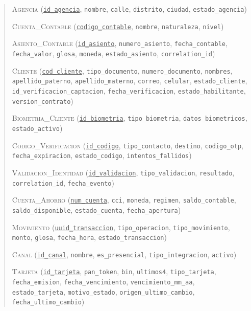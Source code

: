 \begin{quote}\raggedright
\textsc{Agencia} (\underline{\texttt{id\_agencia}}, \texttt{nombre}, \texttt{calle}, \texttt{distrito}, \texttt{ciudad}, \texttt{estado\_agencia})

\textsc{Cuenta\_Contable} (\underline{\texttt{codigo\_contable}}, \texttt{nombre}, \texttt{naturaleza}, \texttt{nivel})

\textsc{Asiento\_Contable} (\underline{\texttt{id\_asiento}}, \texttt{numero\_asiento}, \texttt{fecha\_contable}, \texttt{fecha\_valor}, \texttt{glosa}, \texttt{moneda}, \texttt{estado\_asiento}, \texttt{correlation\_id})

\textsc{Cliente} (\underline{\texttt{cod\_cliente}}, \texttt{tipo\_documento}, \texttt{numero\_documento}, \texttt{nombres}, \texttt{apellido\_paterno}, \texttt{apellido\_materno}, \texttt{correo}, \texttt{celular}, \texttt{estado\_cliente}, \texttt{id\_verificacion\_captacion}, \texttt{fecha\_verificacion}, \texttt{estado\_habilitante}, \texttt{version\_contrato})

\textsc{Biometria\_Cliente} (\underline{\texttt{id\_biometria}}, \texttt{tipo\_biometria}, \texttt{datos\_biometricos}, \texttt{estado\_activo})

\textsc{Codigo\_Verificacion} (\underline{\texttt{id\_codigo}}, \texttt{tipo\_contacto}, \texttt{destino}, \texttt{codigo\_otp}, \texttt{fecha\_expiracion}, \texttt{estado\_codigo}, \texttt{intentos\_fallidos})

\textsc{Validacion\_Identidad} (\underline{\texttt{id\_validacion}}, \texttt{tipo\_validacion}, \texttt{resultado}, \texttt{correlation\_id}, \texttt{fecha\_evento})

\textsc{Cuenta\_Ahorro} (\underline{\texttt{num\_cuenta}}, \texttt{cci}, \texttt{moneda}, \texttt{regimen}, \texttt{saldo\_contable}, \texttt{saldo\_disponible}, \texttt{estado\_cuenta}, \texttt{fecha\_apertura})

\textsc{Movimiento} (\underline{\texttt{uuid\_transaccion}}, \texttt{tipo\_operacion}, \texttt{tipo\_movimiento}, \texttt{monto}, \texttt{glosa}, \texttt{fecha\_hora}, \texttt{estado\_transaccion})

\textsc{Canal} (\underline{\texttt{id\_canal}}, \texttt{nombre}, \texttt{es\_presencial}, \texttt{tipo\_integracion}, \texttt{activo})

\textsc{Tarjeta} (\underline{\texttt{id\_tarjeta}}, \texttt{pan\_token}, \texttt{bin}, \texttt{ultimos4}, \texttt{tipo\_tarjeta}, \texttt{fecha\_emision}, \texttt{fecha\_vencimiento}, \texttt{vencimiento\_mm\_aa}, \texttt{estado\_tarjeta}, \texttt{motivo\_estado}, \texttt{origen\_ultimo\_cambio}, \texttt{fecha\_ultimo\_cambio})


\end{quote}
